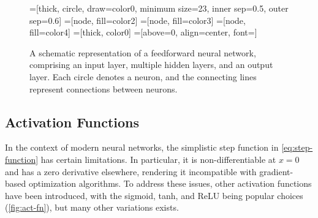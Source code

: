 \begin{figure}[tb]
        =[thick, circle, draw=color0, minimum size=23, 
                          inner sep=0.5, outer sep=0.6]
     =[node, fill=color2]
 =[node, fill=color3]
    =[node, fill=color4]
     =[thick, color0]
       =[above=0, align=center, font=\sffamily]
\def\nstyle{int(\lay<\Nnodlen?min(2,\lay):3)} %
\centering
{}
\caption[Schematic of a Feedforward Neural Network]{
    A schematic representation of a feedforward neural network, 
    comprising an input layer, multiple hidden layers, and an output layer. 
    Each circle denotes a neuron, and the connecting lines represent 
    connections between neurons.}
\label{fig:nn-structure}
\end{figure}

\subsection{Activation Functions}

In the context of modern neural networks, 
the simplistic step function in \cref{eq:step-function} 
has certain limitations.
In particular, it is non-differentiable at \(x = 0\) and
has a zero derivative elsewhere, 
rendering it incompatible with gradient-based optimization algorithms.  
To address these issues, other activation functions
have been introduced,
with the sigmoid, \ac{tanh}, and \ac{ReLU} being popular choices 
(\cref{fig:act-fn}), but many other variations exists.
~\autocite{cholletDeep2021}

